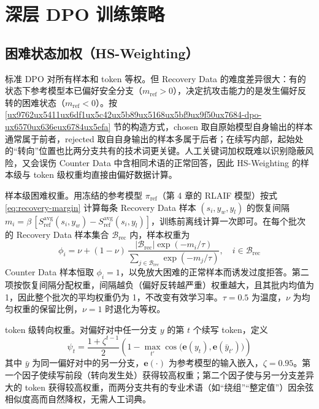 \documentclass[fontset=fandol,type=master,campus=shenzhen,etitleauto=true]{hithesisbook}
\begin{document}
\section{深层 DPO 训练策略}\label{ux6df1ux5c42-dpo-ux8badux7ec3ux7b56ux7565}

\subsection{困难状态加权（HS-Weighting）}\label{rt-weighting}

标准 DPO 对所有样本和 token 等权。但 Recovery Data 的难度差异很大：有的状态下参考模型本已偏好安全分支（$m_{\text{ref}} > 0$），决定抗攻击能力的是发生偏好反转的困难状态（$m_{\text{ref}} < 0$）。按 \ref{ux9762ux5411ux6df1ux5c42ux5b89ux5168ux5bf9ux9f50ux7684-dpo-ux6570ux636eux6784ux5efa} 节的构造方式，chosen 取自原始模型自身输出的样本通常属于前者，rejected 取自自身输出的样本多属于后者；在续写内部，起始处的“转向”位置也比两分支共有的技术词更关键。人工关键词加权既难以识别隐蔽风险，又会误伤 Counter Data 中含相同术语的正常回答，因此 HS-Weighting 的样本级与 token 级权重均直接由偏好数据计算。

样本级困难权重。用冻结的参考模型 $\pi_{\text{ref}}$（第 4 章的 RLAIF 模型）按式 \eqref{eq:recovery-margin} 计算每条 Recovery Data 样本 $(s_i, y_w, y_l)$ 的恢复间隔 $m_i = \beta\,[S^{\text{avg}}_{\text{ref}}(s_i, y_w) - S^{\text{avg}}_{\text{ref}}(s_i, y_l)]$，训练前离线计算一次即可。在每个批次的 Recovery Data 样本集合 $\mathcal{B}_{\text{rec}}$ 内，样本权重为
\begin{equation}
\phi_i = \nu + (1 - \nu)\,\frac{|\mathcal{B}_{\text{rec}}| \exp(-m_i / \tau)}{\sum_{j \in \mathcal{B}_{\text{rec}}} \exp(-m_j / \tau)}, \quad i \in \mathcal{B}_{\text{rec}}
\end{equation}
Counter Data 样本恒取 $\phi_i = 1$，以免放大困难的正常样本而诱发过度拒答。第二项按恢复间隔分配权重，间隔越负（偏好反转越严重）权重越大，且其批内均值为 1，因此整个批次的平均权重仍为 1，不改变有效学习率。$\tau = 0.5$ 为温度，$\nu$ 为均匀权重的保留比例，$\nu = 1$ 时退化为等权。

token 级转向权重。对偏好对中任一分支 $y$ 的第 $t$ 个续写 token，定义
\begin{equation}
\psi_t = \frac{1 + \zeta^{t-1}}{2} \left( 1 - \max_{t'} \cos\!\big(\mathbf{e}(y_t), \mathbf{e}(\bar{y}_{t'})\big) \right)
\end{equation}
其中 $\bar{y}$ 为同一偏好对中的另一分支，$\mathbf{e}(\cdot)$ 为参考模型的输入嵌入，$\zeta = 0.95$。第一个因子使续写前段（转向发生处）获得较高权重；第二个因子使与另一分支差异大的 token 获得较高权重，而两分支共有的专业术语（如“绕组”“整定值”）因余弦相似度高而自然降权，无需人工词典。
\end{document}
